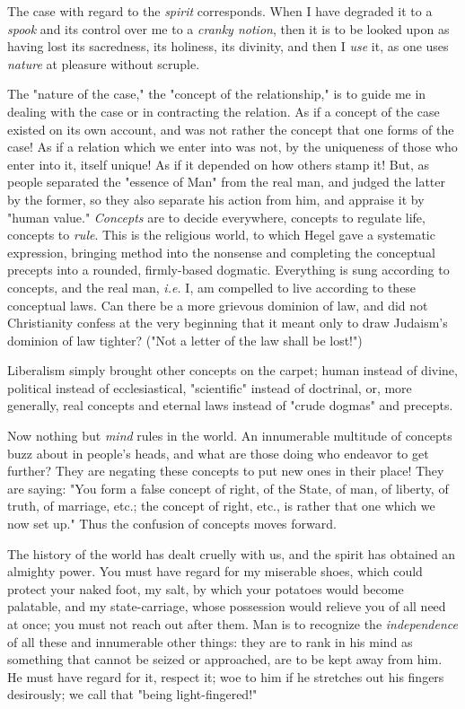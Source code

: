 The case with regard to the \textit{spirit} corresponds. When I have degraded 
it to a \textit{spook} and its control over me to a \textit{cranky notion}, 
then it is to be looked upon as having lost its sacredness, its holiness, its 
divinity, and then I \textit{use} it, as one uses \textit{nature} at pleasure 
without scruple.

The "{}nature of the case,"{} the "{}concept of the relationship,"{} is to 
guide me in dealing with the case or in contracting the relation. As if a 
concept of the case existed on its own account, and was not rather the concept 
that one forms of the case! As if a relation which we enter into was not, by 
the uniqueness of those who enter into it, itself unique! As if it depended on 
how others stamp it! But, as people separated the "{}essence of Man"{} from 
the real man, and judged the latter by the former, so they also separate his 
action from him, and appraise it by "{}human value."{} \textit{Concepts} are 
to decide everywhere, concepts to regulate life, concepts to \textit{rule}. 
This is the religious world, to which Hegel gave a systematic expression, 
bringing method into the nonsense and completing the conceptual precepts into 
a rounded, firmly-based dogmatic. Everything is sung according to concepts, 
and the real man, \textit{i.e.} I, am compelled to live according to these 
conceptual laws. Can there be a more grievous dominion of law, and did not 
Christianity confess at the very beginning that it meant only to draw 
Judaism's dominion of law tighter? ("{}Not a letter of the law shall be 
lost!"{})

Liberalism simply brought other concepts on the carpet; human instead of 
divine, political instead of ecclesiastical, "{}scientific"{} instead of 
doctrinal, or, more generally, real concepts and eternal laws instead of 
"{}crude dogmas"{} and precepts.

Now nothing but \textit{mind} rules in the world. An innumerable multitude of 
concepts buzz about in people's heads, and what are those doing who endeavor 
to get further? They are negating these concepts to put new ones in their 
place! They are saying: "{}You form a false concept of right, of the State, of 
man, of liberty, of truth, of marriage, etc.; the concept of right, etc., is 
rather that one which we now set up."{} Thus the confusion of concepts moves 
forward.

The history of the world has dealt cruelly with us, and the spirit has 
obtained an almighty power. You must have regard for my miserable shoes, which 
could protect your naked foot, my salt, by which your potatoes would become 
palatable, and my state-carriage, whose possession would relieve you of all 
need at once; you must not reach out after them. Man is to recognize the 
\textit{independence} of all these and innumerable other things: they are to 
rank in his mind as something that cannot be seized or approached, are to be 
kept away from him. He must have regard for it, respect it; woe to him if he 
stretches out his fingers desirously; we call that "{}being light-fingered!"{}

